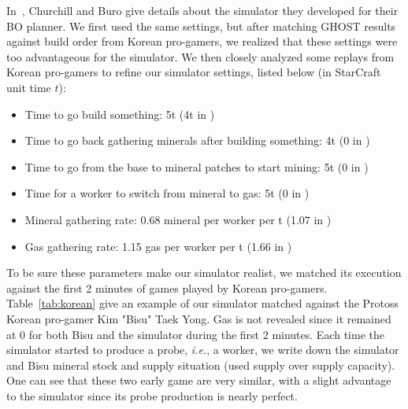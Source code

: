 \documentclass[journal]{IEEEtran}
\newcommand{\ghost}{\textsc{GHOST}\xspace}
\newcommand{\ie}{\textit{i.e.}}
\begin{document}
In~\cite{ChurchillB11},  Churchill and  Buro  give  details about  the
simulator they developed for their BO planner.  We first used
the same  settings, but  after matching  \ghost results  against build
order from Korean pro-gamers, we realized that these settings were too
advantageous for the simulator.  We then closely analyzed some replays
from Korean pro-gamers to refine  our simulator settings, listed below
(in StarCraft unit time $t$):
\begin{itemize}
\item Time to go build something: 5t (4t in \cite{ChurchillB11})
\item Time to go back  gathering minerals after building something: 4t
  (0 in \cite{ChurchillB11})
\item Time to go from the base  to mineral patches to start mining: 5t
  (0 in \cite{ChurchillB11})
\item  Time for  a worker  to  switch from  mineral  to gas:  5t (0  in
  \cite{ChurchillB11})
\item Mineral gathering  rate: 0.68 mineral per worker per  t (1.07 in
  \cite{ChurchillB11})
\item  Gas  gathering  rate:  1.15  gas per  worker  per  t  (1.66  in
  \cite{ChurchillB11})
\end{itemize}  
To be sure these parameters make our simulator realist, we matched its
execution  against the  first  2  minutes of  games  played by  Korean
pro-gamers. Table~\ref{tab:korean}  give an  example of  our simulator
matched against the Protoss Korean pro-gamer Kim "Bisu" Taek Yong. Gas
is not revealed since it remained at 0 for both Bisu and the simulator
during the first 2 minutes. Each time the simulator started to produce
a probe, \ie,  a worker, we write down the  simulator and Bisu mineral
stock and supply situation (used supply over supply capacity). One can
see  that  these two  early  game  are  very  similar, with  a  slight
advantage  to  the simulator  since  its  probe production  is  nearly
perfect.
\end{document}
